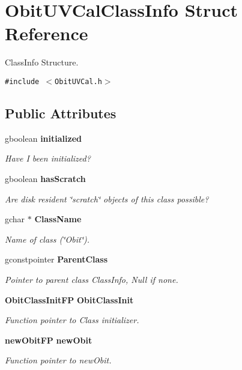 \section{Obit\-UVCal\-Class\-Info Struct Reference}
\label{structObitUVCalClassInfo}
Class\-Info Structure.  


{\tt \#include $<$Obit\-UVCal.h$>$}

\subsection*{Public Attributes}
\begin{CompactItemize}
\item 
gboolean {\bf initialized}
\begin{CompactList}\small\item\em Have I been initialized? \item\end{CompactList}\item 
gboolean {\bf has\-Scratch}
\begin{CompactList}\small\item\em Are disk resident \char`\"{}scratch\char`\"{} objects of this class possible? \item\end{CompactList}\item 
gchar $\ast$ {\bf Class\-Name}
\begin{CompactList}\small\item\em Name of class (\char`\"{}Obit\char`\"{}). \item\end{CompactList}\item 
gconstpointer {\bf Parent\-Class}
\begin{CompactList}\small\item\em Pointer to parent class Class\-Info, Null if none. \item\end{CompactList}\item 
{\bf Obit\-Class\-Init\-FP} {\bf Obit\-Class\-Init}
\begin{CompactList}\small\item\em Function pointer to Class initializer. \item\end{CompactList}\item 
{\bf new\-Obit\-FP} {\bf new\-Obit}
\begin{CompactList}\small\item\em Function pointer to new\-Obit. \item\end{CompactList}\item 

\end{CompactItemize}
